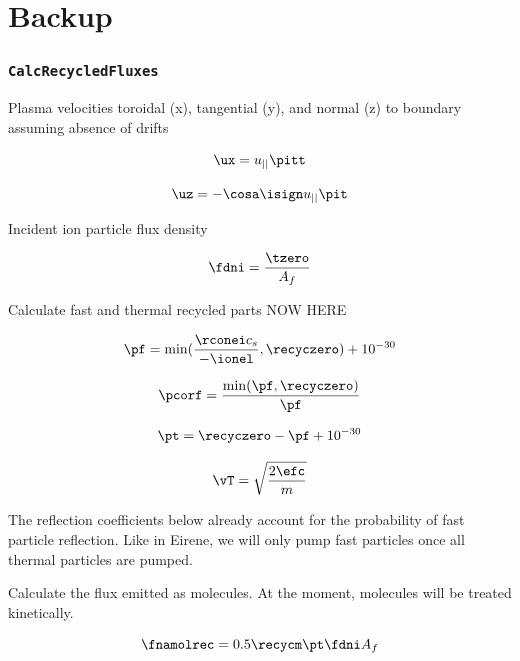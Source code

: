 \chapter{Backup}

\subsection{\texttt{CalcRecycledFluxes}}

Plasma velocities toroidal (x), tangential (y), and normal (z) to boundary assuming absence of drifts

\begin{equation}
      \ux = u_{||} \pitt
\end{equation}

\begin{equation}
    \uz = - \cosa \isign u_{||} \pit
\end{equation}

Incident ion particle flux density

\begin{equation}
    \fdni = \frac{\tzero}{A_f}
\end{equation}

Calculate fast and thermal recycled parts
      NOW HERE

\begin{equation}
    \pf = \mathrm{min}(\frac{\rconei c_s}{- \ionel},\recyczero) + 10^{-30}
\end{equation}

\begin{equation}
    \pcorf = \frac{\mathrm{min}(\pf,\recyczero)}{\pf}
\end{equation}

\begin{equation}
    \pt = \recyczero - \pf + 10^{-30}
\end{equation}

\begin{equation}
    \vT = \sqrt{\frac{2 \efc}{m}}
\end{equation}

The reflection coefficients below already account for the probability of fast particle reflection. Like in Eirene, we will only pump fast particles once all thermal particles are pumped.

Calculate the flux emitted as molecules. At the moment, molecules will be treated kinetically.

\begin{equation}
     \fnamolrec =  0.5 \recycm \pt \fdni A_f
\end{equation}

